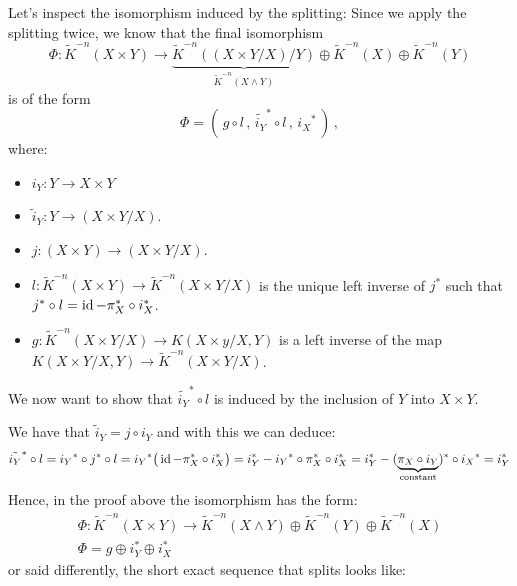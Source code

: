 \begin{corollary}\label{cor:kTheo-splittingAndConnectionWedgeAndProduct}
	Let's inspect the isomorphism induced by the splitting:  Since we apply the splitting twice, we know that the final isomorphism 
	\begin{equation*}
		\Phi: \tilde{K}^{-n}(X\times Y) \to \underbrace{\tilde{K}^{-n}((X\times Y \slash X )\slash Y)}_{\tilde{K}^{-n}(X\wedge Y)}\oplus\tilde{K}^{-n}(X) \oplus \tilde{K}^{-n}(Y)
	\end{equation*} is of the form 
	\begin{equation*}
		\Phi=(\,g\circ l\,,\,\tilde{i_Y}^* \circ l\,,\, {i_X}^*\,)\,,
	\end{equation*} where:
	\begin{itemize}
		\item $i_Y:Y\to X\times Y$
		\item $\tilde{i}_Y:Y\to (X\times Y\slash X)$.
		\item $j:(X\times Y)\to (X\times Y\slash X)$.
		\item $l:\tilde{K}^{-n}(X\times Y) \to \tilde{K}^{-n}(X\times Y\slash X)$ is the unique left inverse of $j^*$ such that $j^*\circ l=\operatorname{\mathrm{id}}-\pi_X^* \circ i_X^*$.
		\item $g: \tilde{K}^{-n}(X\times Y\big/ X)\to K(X\times y\big/ X,Y)$ is a left inverse of the map $ K(X\times Y\big/ X,Y)\to \tilde{K}^{-n}(X\times Y\big/ X)$.
	\end{itemize}



	We now want to show that $\tilde{i_Y}^* \circ l$ is induced by the inclusion of $Y$ into $X\times Y$.

	We have that $\tilde{i}_Y=j\circ i_Y$ and with this we can deduce:
	\begin{equation*}
		\tilde{i_Y}^* \circ l={i_Y}^*\circ j^* \circ l ={i_Y}^*\big(\operatorname{\mathrm{id}}-\pi_X^* \circ i_X^*\big)=i_Y^*-{i_Y}^*\circ \pi_X^* \circ i_X^*=i_Y^*-(\underbrace{\pi_X\circ i_Y}_{\text{constant}})^*\circ {i_X}^*=i_Y^*
	\end{equation*}
	Hence, in the proof above the isomorphism has the form:
	\begin{align*}
		\Phi: \tilde{K}^{-n}(X\times Y)\to \tilde{K}^{-n}(X\wedge Y)\oplus \tilde{K}^{-n}(Y)\oplus \tilde{K}^{-n}(X) \\ 
		\Phi=g\oplus i_Y^*\oplus i_X^*
	\end{align*}or said differently, the short exact sequence that splits looks like: 
	\begin{center}
	
	\end{center}
\end{corollary}




